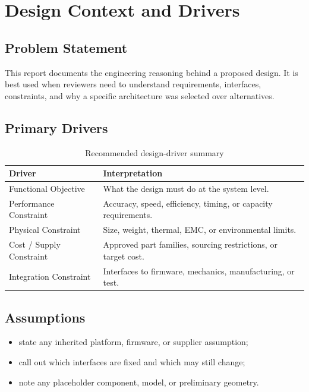 \section{Design Context and Drivers}

\subsection{Problem Statement}
This report documents the engineering reasoning behind a proposed design. It is
best used when reviewers need to understand requirements, interfaces,
constraints, and why a specific architecture was selected over alternatives.


\subsection{Primary Drivers}
\begin{table}[H]
    \centering
    \small
    \begin{tabular}{l p{9.5cm}}
        \toprule
        \textbf{Driver} & \textbf{Interpretation} \\
        \midrule
        Functional Objective & What the design must do at the system level. \\
        Performance Constraint & Accuracy, speed, efficiency, timing, or capacity requirements. \\
        Physical Constraint & Size, weight, thermal, EMC, or environmental limits. \\
        Cost / Supply Constraint & Approved part families, sourcing restrictions, or target cost. \\
        Integration Constraint & Interfaces to firmware, mechanics, manufacturing, or test. \\
        \bottomrule
    \end{tabular}
    \caption{Recommended design-driver summary}
    \label{tab:design-drivers}
\end{table}

\subsection{Assumptions}
\begin{itemize}
    \item state any inherited platform, firmware, or supplier assumption;
    \item call out which interfaces are fixed and which may still change;
    \item note any placeholder component, model, or preliminary geometry.
\end{itemize}
